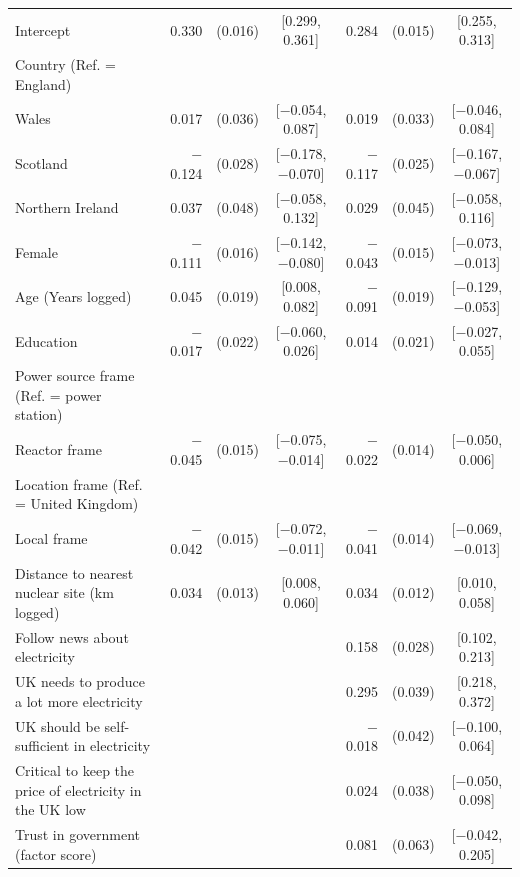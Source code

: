 \begin{landscape}
\begin{longtable}[t]{>{\raggedright\arraybackslash}p{2.8in}rrcrrc}
\endfoot
\bottomrule
\endlastfoot
Intercept & 0.330 & (0.016) & {}[0.299, 0.361] & 0.284 & (0.015) & {}[0.255, 0.313]\\
Country (Ref. = England) &  &  &  &  &  & \\
\hspace{1em}Wales & 0.017 & (0.036) & {}[$-$0.054, 0.087] & 0.019 & (0.033) & {}[$-$0.046, 0.084]\\
\hspace{1em}Scotland & $-$0.124 & (0.028) & {}[$-$0.178, $-$0.070] & $-$0.117 & (0.025) & {}[$-$0.167, $-$0.067]\\
\hspace{1em}Northern Ireland & 0.037 & (0.048) & {}[$-$0.058, 0.132] & 0.029 & (0.045) & {}[$-$0.058, 0.116]\\
Female & $-$0.111 & (0.016) & {}[$-$0.142, $-$0.080] & $-$0.043 & (0.015) & {}[$-$0.073, $-$0.013]\\
Age (Years logged) & 0.045 & (0.019) & {}[0.008, 0.082] & $-$0.091 & (0.019) & {}[$-$0.129, $-$0.053]\\
Education & $-$0.017 & (0.022) & {}[$-$0.060, 0.026] & 0.014 & (0.021) & {}[$-$0.027, 0.055]\\
Power source frame (Ref. = power station) &  &  &  &  &  & \\
\hspace{1em}Reactor frame & $-$0.045 & (0.015) & {}[$-$0.075, $-$0.014] & $-$0.022 & (0.014) & {}[$-$0.050, 0.006]\\
Location frame (Ref. = United Kingdom) &  &  &  &  &  & \\
\hspace{1em}Local frame & $-$0.042 & (0.015) & {}[$-$0.072, $-$0.011] & $-$0.041 & (0.014) & {}[$-$0.069, $-$0.013]\\
Distance to nearest nuclear site (km logged) & 0.034 & (0.013) & {}[0.008, 0.060] & 0.034 & (0.012) & {}[0.010, 0.058]\\
Follow news about electricity &  &  &  & 0.158 & (0.028) & {}[0.102, 0.213]\\
UK needs to produce a lot more electricity &  &  &  & 0.295 & (0.039) & {}[0.218, 0.372]\\
UK should be self-sufficient in electricity &  &  &  & $-$0.018 & (0.042) & {}[$-$0.100, 0.064]\\
Critical to keep the price of electricity in the UK low &  &  &  & 0.024 & (0.038) & {}[$-$0.050, 0.098]\\
Trust in government (factor score) &  &  &  & 0.081 & (0.063) & {}[$-$0.042, 0.205]\\

\end{longtable}
\end{landscape}
